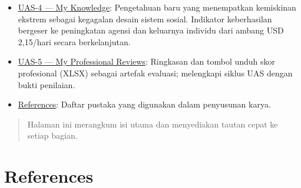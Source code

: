 \documentclass[
  letterpaper,
  DIV=11,
  numbers=noendperiod]{scrreprt}
\begin{document}
\begin{itemize}
  berkelanjutan.
\item
  \hyperref[uas-4-my-knowledge-_ux1564]{UAS-4 --- My Knowledge}:
  Pengetahuan baru yang menempatkan kemiskinan ekstrem sebagai kegagalan
  desain sistem sosial. Indikator keberhasilan bergeser ke peningkatan
  agensi dan keluarnya individu dari ambang USD 2,15/hari secara
  berkelanjutan.
\item
  \hyperref[uas-5-my-professional-reviews-ux30feuxe51uxff89]{UAS-5 ---
  My Professional Reviews}: Ringkasan dan tombol unduh skor profesional
  (XLSX) sebagai artefak evaluasi; melengkapi siklus UAS dengan bukti
  penilaian.
\item
  \href{references.qmd}{References}: Daftar pustaka yang digunakan dalam
  penyusunan karya.
\end{itemize}

\begin{quote}
Halaman ini merangkum isi utama dan menyediakan tautan cepat ke setiap
bagian.
\end{quote}


\chapter*{References}\label{references}


\label{refs}
\end{document}
